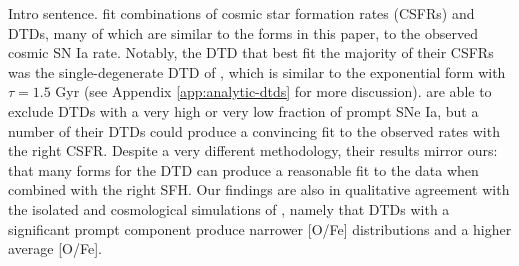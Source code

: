 \documentclass[twocolumn,twocolappendix,linenumbers]{aastex631}
\newcommand{\todo}[1]{{\color{red}#1}}
\begin{document}
\todo{Intro sentence}. \citet{Palicio2024-CosmicSNIaRate} fit combinations of cosmic star formation rates (CSFRs) and DTDs, many of which are similar to the forms in this paper, to the observed cosmic SN Ia rate. Notably, the DTD that best fit the majority of their CSFRs was the single-degenerate DTD of \citet{MatteucciRecchi2001-SNIaTimescale}, which is similar to the exponential form with $\tau=1.5$ Gyr (see Appendix \ref{app:analytic-dtds} for more discussion). \citet{Palicio2024-CosmicSNIaRate} are able to exclude DTDs with a very high or very low fraction of prompt SNe Ia, but a number of their DTDs could produce a convincing fit to the observed rates with the right CSFR. Despite a very different methodology, their results mirror ours: that many forms for the DTD can produce a reasonable fit to the data when combined with the right SFH. Our findings are also in qualitative agreement with the isolated and cosmological simulations of \citet{Poulhazan2018-PrecisionPollution}, namely that DTDs with a significant prompt component produce narrower [O/Fe] distributions and a higher average [O/Fe].
\end{document}
